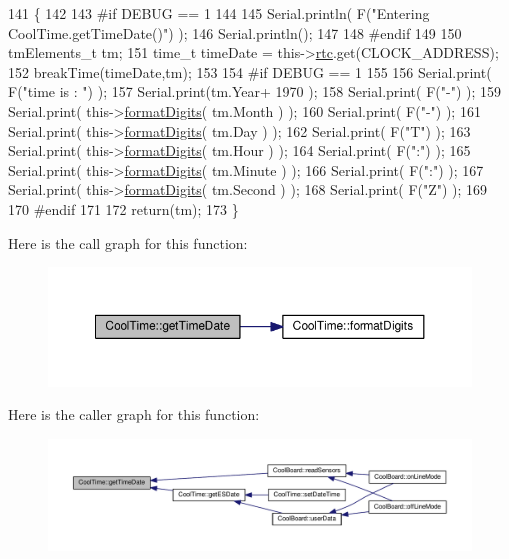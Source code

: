 \begin{DoxyCode}
141 \{
142 
143 \textcolor{preprocessor}{#if DEBUG == 1 }
144     
145     Serial.println( F(\textcolor{stringliteral}{"Entering CoolTime.getTimeDate()"}) );
146     Serial.println();
147 
148 \textcolor{preprocessor}{#endif}
149 
150     tmElements\_t tm;
151     time\_t timeDate = this->\hyperlink{class_cool_time_abd38f2384ff90692b1568d9db869412e}{rtc}.get(CLOCK\_ADDRESS);
152     breakTime(timeDate,tm);
153 
154 \textcolor{preprocessor}{#if DEBUG == 1}
155     
156     Serial.print( F(\textcolor{stringliteral}{"time is : "}) );
157     Serial.print(tm.Year+ 1970 );
158     Serial.print( F(\textcolor{stringliteral}{"-"}) );
159     Serial.print( this->\hyperlink{class_cool_time_acd537cd4210d7bde4e1f5c47d2ac0456}{formatDigits}( tm.Month ) );
160     Serial.print( F(\textcolor{stringliteral}{"-"}) );
161     Serial.print( this->\hyperlink{class_cool_time_acd537cd4210d7bde4e1f5c47d2ac0456}{formatDigits}( tm.Day ) );
162     Serial.print( F(\textcolor{stringliteral}{"T"}) );
163     Serial.print( this->\hyperlink{class_cool_time_acd537cd4210d7bde4e1f5c47d2ac0456}{formatDigits}( tm.Hour ) );
164     Serial.print( F(\textcolor{stringliteral}{":"}) );
165     Serial.print( this->\hyperlink{class_cool_time_acd537cd4210d7bde4e1f5c47d2ac0456}{formatDigits}( tm.Minute ) );
166     Serial.print( F(\textcolor{stringliteral}{":"}) );
167     Serial.print( this->\hyperlink{class_cool_time_acd537cd4210d7bde4e1f5c47d2ac0456}{formatDigits}( tm.Second ) );
168     Serial.print( F(\textcolor{stringliteral}{"Z"}) );
169 
170 \textcolor{preprocessor}{#endif}
171     
172     \textcolor{keywordflow}{return}(tm);
173 \}
\end{DoxyCode}
Here is the call graph for this function\+:\nopagebreak
\begin{figure}[H]
\begin{center}
\leavevmode
\includegraphics[width=350pt]{d6/d49/class_cool_time_a7a7501c5ca77dd1248bea704c44f986c_cgraph}
\end{center}
\end{figure}
Here is the caller graph for this function\+:\nopagebreak
\begin{figure}[H]
\begin{center}
\leavevmode
\includegraphics[width=350pt]{d6/d49/class_cool_time_a7a7501c5ca77dd1248bea704c44f986c_icgraph}
\end{center}
\end{figure}
